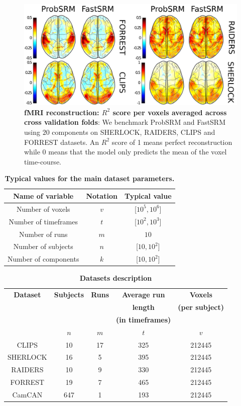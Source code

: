 \begin{figure}
\centering
\includegraphics[scale=0.43]{figures/srm/mean_r2_reconstruction.png}
\caption{\textbf{fMRI reconstruction: $R^2$ score per voxels averaged across cross validation folds}: We benchmark ProbSRM and FastSRM using $20$ components on SHERLOCK, RAIDERS, CLIPS and FORREST datasets. An $R^2$ score of 1 means perfect reconstruction while 0 means that the model only predicts the mean of the voxel time-course.}
\label{fig:example_r2}
\end{figure}


\begin{table}
\centering
\begin{tabular}{c|c|c}
	Name of variable &  Notation & Typical value \\
	\hline
	Number of voxels & $v$ & [$10^5, 10^6$] \\
	Number of timeframes & $t$ & [$10^2, 10^3$] \\
	Number of runs & $m$ & $10$ \\
	Number of subjects & $n$ & [$10, 10^2$] \\
	Number of components & $k$ & [$10, 10^2$]
\end{tabular}
\caption{\textbf{Typical values for the main dataset parameters.}}
\label{tab:typical}
\end{table}

\begin{table}
	\begin{tabular}{|c|c|c|c|c|}
		\hline
		\textbf{Dataset} & \textbf{Subjects} & \textbf{Runs} & \textbf{Average run} & \textbf{Voxels} \\
	&& & \textbf{length} & \textbf{(per subject)} \\
	&& & \textbf{(in timeframes)} &  \\
	&$n$& $m$ & $t$ &$v$  \\
		\hline
		CLIPS & 10 & 17 & 325 & 212445\\ 
		\hline
		SHERLOCK & 16 & 5 & 395 & 212445 \\ 
		\hline
		RAIDERS & 10 & 9 & 330 & 212445 \\
		\hline 
		FORREST & 19 & 7 & 465 & 212445\\
		\hline
		CamCAN & 647 & 1 & 193 & 212445 \\
		\hline
	\end{tabular}
\caption{\textbf{Datasets description}}
\label{tab:dataset_desc}
\end{table}